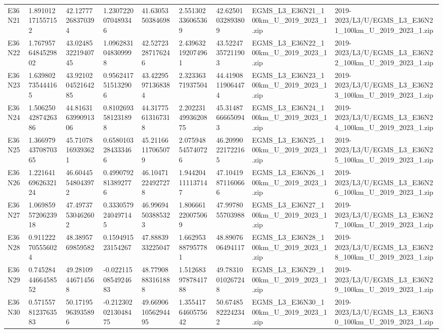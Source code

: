 \begin{landscape}
\begin{longtable}{lllllllll}
E36N21 & 1.891012171557152 & 42.12777268370394 & 1.2307220070489346 & 41.6305350384698 & 2.551302336065369 & 42.62501032893809 & EGMS\_L3\_E36N21\_100km\_U\_2019\_2023\_1.zip & 2019-2023/L3/U/EGMS\_L3\_E36N21\_100km\_U\_2019\_2023\_1.zip \\
E36N22 & 1.7679576484529802 & 43.024853221940745 & 1.0962831048309998 & 42.52723287176246 & 2.439632192074961 & 43.52247357211903 & EGMS\_L3\_E36N22\_100km\_U\_2019\_2023\_1.zip & 2019-2023/L3/U/EGMS\_L3\_E36N22\_100km\_U\_2019\_2023\_1.zip \\
E36N23 & 1.639802735444165 & 43.921020452164285 & 0.9562417515132906 & 43.42295971368384 & 2.32336371937504 & 44.41908119064474 & EGMS\_L3\_E36N23\_100km\_U\_2019\_2023\_1.zip & 2019-2023/L3/U/EGMS\_L3\_E36N23\_100km\_U\_2019\_2023\_1.zip \\
E36N24 & 1.5062504287426386 & 44.816316399091306 & 0.8102693581231898 & 44.31775613167318 & 2.2022314993620875 & 45.31487666650943 & EGMS\_L3\_E36N24\_100km\_U\_2019\_2023\_1.zip & 2019-2023/L3/U/EGMS\_L3\_E36N24\_100km\_U\_2019\_2023\_1.zip \\
E36N25 & 1.3669794370870365 & 45.71078169393621 & 0.6580103284333466 & 45.21166117065079 & 2.075948545740726 & 46.20990221722165 & EGMS\_L3\_E36N25\_100km\_U\_2019\_2023\_1.zip & 2019-2023/L3/U/EGMS\_L3\_E36N25\_100km\_U\_2019\_2023\_1.zip \\
E36N26 & 1.2216416962632124 & 46.60445548043972 & 0.4990792813892776 & 46.10471224927278 & 1.944204111137147 & 47.10419871160666 & EGMS\_L3\_E36N26\_100km\_U\_2019\_2023\_1.zip & 2019-2023/L3/U/EGMS\_L3\_E36N26\_100km\_U\_2019\_2023\_1.zip \\
E36N27 & 1.0698595720623918 & 47.49737530462602 & 0.3330579240497145 & 46.99694503885323 & 1.806661220075069 & 47.9978055703988 & EGMS\_L3\_E36N27\_100km\_U\_2019\_2023\_1.zip & 2019-2023/L3/U/EGMS\_L3\_E36N27\_100km\_U\_2019\_2023\_1.zip \\
E36N28 & 0.911222705556024 & 48.3895769859582 & 0.159491523154267 & 47.8883933225047 & 1.662953887957781 & 48.8907606494117 & EGMS\_L3\_E36N28\_100km\_U\_2019\_2023\_1.zip & 2019-2023/L3/U/EGMS\_L3\_E36N28\_100km\_U\_2019\_2023\_1.zip \\
E36N29 & 0.7452844466458552 & 49.28109446714568 & -0.0221150854924683 & 48.77908883161888 & 1.5126839787841788 & 49.78310010267248 & EGMS\_L3\_E36N29\_100km\_U\_2019\_2023\_1.zip & 2019-2023/L3/U/EGMS\_L3\_E36N29\_100km\_U\_2019\_2023\_1.zip \\
E36N30 & 0.5715578123763583 & 50.17195963935896 & -0.2123020213048475 & 49.669061056294495 & 1.3554176460575642 & 50.67485822242342 & EGMS\_L3\_E36N30\_100km\_U\_2019\_2023\_1.zip & 2019-2023/L3/U/EGMS\_L3\_E36N30\_100km\_U\_2019\_2023\_1.zip \\

\end{longtable}
\end{landscape}
